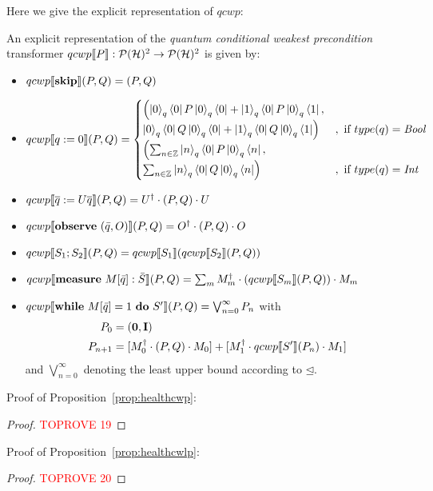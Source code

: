 \documentclass[a4paper,UKenglish,cleveref, autoref, thm-restate]{lipics-v2021}
\begin{document}
Here we give the explicit representation of $qcwp$:
\begin{lemma}
    \label{lem:explicitCWP}
    An explicit representation of the \textit{quantum conditional weakest precondition} transformer $qcwp\llbracket P \rrbracket: \mathcal{P}(\mathcal{H})^2\to \mathcal{P}(\mathcal{H})^2$ is given by:
\begin{itemize}
    \item $qcwp\llbracket \mathbf{skip} \rrbracket (P,Q)=(P,Q)$
    \item $qcwp\llbracket q:=0 \rrbracket (P,Q)=
    \begin{cases}
        \Bigl( \ket{0}_q\bra{0}P\ket{0}_q \bra{0} + \ket{1}_q\bra{0} P \ket{0}_q \bra{1}, &\\
        \ket{0}_q\bra{0}Q\ket{0}_q \bra{0} + \ket{1}_q\bra{0} Q \ket{0}_q \bra{1} \Bigr)
         &,\text{ if }type(q)=\mathit{Bool} \\
         \Bigl( \sum_{n\in \mathbb{Z}} \ket{n}_q \bra{0} P \ket{0}_q\bra{n},&\\
          \sum_{n\in \mathbb{Z}} \ket{n}_q \bra{0} Q \ket{0}_q \bra{n}\Bigr)
        & ,\text{ if }type(q)=\mathit{Int}
    \end{cases}$
    \item $qcwp\llbracket \overline{q}:= U\overline{q} \rrbracket (P,Q)= U^\dagger \cdot (P,Q) \cdot U$
    \item $qcwp\llbracket  \mathbf{observe } \text{ }(\Bar{q},O) \rrbracket (P,Q) = O^\dagger \cdot (P,Q) \cdot O$
    \item $qcwp\llbracket S_1;S_2 \rrbracket (P,Q)=qcwp\llbracket S_1 \rrbracket (qcwp\llbracket S_2 \rrbracket (P,Q) )  $
    \item $qcwp\llbracket \mathbf{measure } \text{ }M[\Bar{q}]:\Bar{S} \rrbracket (P,Q) = \sum_m M_m^\dagger\cdot (qcwp\llbracket S_m \rrbracket (P,Q))\cdot M_m$
    \item $qcwp\llbracket \mathbf{while } \text{ }M[\Bar{q}]=1 \text{ }\mathbf{ do } \text{ }S' \rrbracket (P,Q)= \bigvee_{n=0}^\infty P_n$ with
    \begin{align*}
        P_0  &= (\mathbf{0},\textbf{I})\\
        P_{n+1} &= [M_0^\dagger \cdot (P,Q) \cdot M_0] + [M_1^\dagger \cdot qcwp\llbracket S' \rrbracket (P_n) \cdot M_1]
    \end{align*}
    and $\bigvee_{n=0}^\infty$ denoting the least upper bound according to $\unlhd$.
\end{itemize}
\end{lemma}

Proof of Proposition~\ref{prop:healthcwp}:
\begin{proof}\textcolor{red}{TOPROVE 19}\end{proof}


Proof of Proposition~\ref{prop:healthcwlp}:
\begin{proof}\textcolor{red}{TOPROVE 20}\end{proof}
\end{document}
